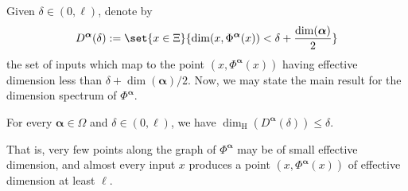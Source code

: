 Given $\delta \in (0, \ell)$, denote by
\begin{align*}
    D^{\boldsymbol{\alpha}}(\delta) := \set{x \in \Xi}{\dim(x, \Phi^{\boldsymbol{\alpha}}(x)) < \delta + \frac{\dim(\boldsymbol{\alpha})}{2}}
\end{align*}
the set of inputs which map to the point $(x, \Phi^{\boldsymbol{\alpha}}(x))$ having effective dimension less than $\delta + \dim(\boldsymbol{\alpha}) / 2$. Now, we may state the main result for the dimension spectrum of $\Phi^{\boldsymbol{\alpha}}$. 

\begin{theorem}
    \label{theorem:dimension_spectrum_of_a_CALF}
    For every $\boldsymbol{\alpha} \in \Omega$ and $\delta \in (0, \ell)$, we have $\dim_{\operatorname{H}}(D^{\boldsymbol{\alpha}}(\delta)) \leq \delta$.
\end{theorem}

That is, very few points along the graph of $\Phi^{\boldsymbol{\alpha}}$ may be of small effective dimension, and almost every input $x$ produces a point $(x, \Phi^{\boldsymbol{\alpha}}(x))$ of effective dimension at least $\ell$.

